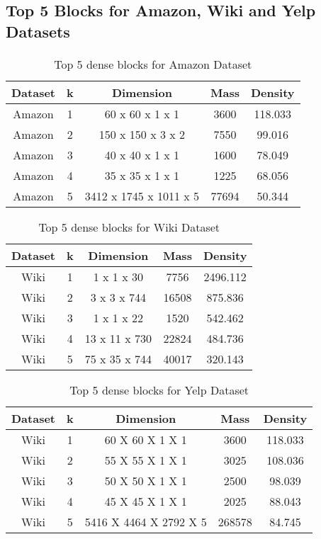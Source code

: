\subsection{Top 5 Blocks for Amazon, Wiki and Yelp Datasets}
\paragraph{}
\begin{table}
\centering
\begin{tabular}{|c|c|c|c|c|}
    \hline
        Dataset & k & Dimension & Mass & Density \\
    \hline
        Amazon & 1 & 60 x 60 x 1 x 1 & 3600 & 118.033 \\
    \hline
        Amazon & 2 & 150 x 150 x 3 x 2 & 7550 & 99.016 \\
    \hline
        Amazon & 3 & 40 x 40 x 1 x 1 & 1600 & 78.049 \\
    \hline
        Amazon & 4 & 35 x 35 x 1 x 1 & 1225 & 68.056 \\
    \hline
        Amazon & 5 & 3412 x 1745 x 1011 x 5 & 77694 & 50.344 \\
    \hline
\end{tabular}
\caption {Top 5 dense blocks for Amazon Dataset}
\end{table}
\begin{table}
\centering
\begin{tabular}{|c|c|c|c|c|}
    \hline
        Dataset & k & Dimension & Mass & Density \\
    \hline
        Wiki & 1 & 1 x 1 x 30 & 7756 & 2496.112 \\
    \hline
        Wiki & 2 & 3 x 3 x 744 & 16508 & 875.836 \\
    \hline
        Wiki & 3 & 1 x 1 x 22 & 1520 & 542.462 \\
    \hline
        Wiki & 4 & 13 x 11 x 730 & 22824 & 484.736 \\
    \hline
        Wiki & 5 & 75 x 35 x 744 & 40017 & 320.143 \\
    \hline
\end{tabular}
\caption {Top 5 dense blocks for Wiki Dataset}
\end{table}
\begin{table}
\centering
\begin{tabular}{|c|c|c|c|c|}
    \hline
        Dataset & k & Dimension & Mass & Density \\
    \hline
        Wiki & 1 & 60 X 60 X 1 X 1 & 3600 & 118.033 \\
    \hline
        Wiki & 2 & 55 X 55 X 1 X 1 & 3025 & 108.036 \\
    \hline
        Wiki & 3 & 50 X 50 X 1 X 1 & 2500 & 98.039 \\
    \hline
        Wiki & 4 & 45 X 45 X 1 X 1 & 2025 & 88.043 \\
    \hline
        Wiki & 5 & 5416 X 4464 X 2792 X 5 & 268578 & 84.745 \\
    \hline
\end{tabular}
\caption {Top 5 dense blocks for Yelp Dataset}
\end{table}
